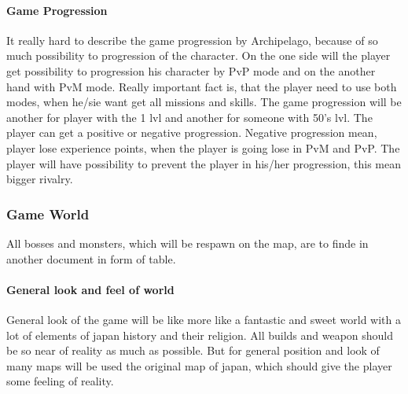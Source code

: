\documentclass[parskip=full]{scrartcl}
\begin{document}
					\paragraph{Game Progression} \vspace{-0.5cm}
						\par \begingroup
						\leftskip=2cm
						\noindent
								It really hard to describe the game progression by Archipelago, because of so much possibility to progression of the character. On the one side will the player get possibility to progression his character by PvP mode and on the another hand with PvM mode. Really important fact is, that the player need to use both modes, when he/sie want get all missions and skills. The game progression will be another for player with the 1 lvl and another for someone with 50’s lvl. The player can get a positive or negative progression. Negative progression mean, player lose experience points, when the player is going lose in PvM and PvP. The player will have possibility to prevent the player in his/her progression, this mean bigger rivalry. 
						\par \endgroup
				\subsubsection{Game World} \vspace{-5mm}
					\par \begingroup
					\leftskip=2cm
					\noindent
							All bosses and monsters, which will be respawn on the map, are to finde in another document in form of table.
					\par \endgroup
					\paragraph{General look and feel of world} \vspace{-5mm}
						\par \begingroup
						\leftskip=2cm
						\noindent
								General look of the game will be like more like a fantastic and sweet world with a lot of elements of japan history and their religion. All builds and weapon should be so near of reality as much as possible. But for general position and look of many maps will be used the original map of japan, which should give the player some feeling of reality.
						\par \endgroup
\end{document}
